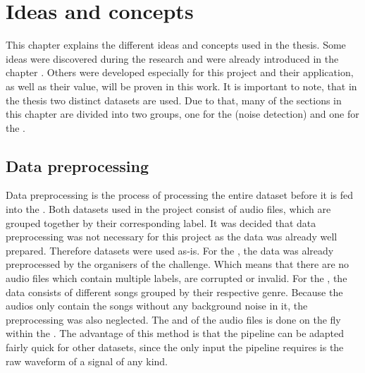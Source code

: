 \chapter{Ideas and concepts}
\label{ch:Ideas-Concepts}
This chapter explains the different ideas and concepts used in the thesis. Some ideas were discovered during the research and were already introduced in the chapter . Others were developed especially for this project and their application, as well as their value, will be proven in this work.
\newline
\newline
It is important to note, that in the thesis two distinct datasets are used. Due to that, many of the sections in this chapter are divided into two groups, one for the  (noise detection) and one for the .

\section{Data preprocessing}
\label{sec:Data-Preprocessing}
Data preprocessing is the process of processing the entire dataset before it is fed into the . Both datasets used in the project consist of audio files, which are grouped together by their corresponding label. It was decided that data preprocessing was not necessary for this project as the data was already well prepared. Therefore datasets were used as-is.
\newline
\newline
For the , the data was already preprocessed by the organisers of the challenge. Which means that there are no audio files which contain multiple labels, are corrupted or invalid.
\newline
\newline
For the , the data consists of different songs grouped by their respective genre. Because the audios only contain the songs without any background noise in it, the preprocessing was also neglected. 
\newline
\newline
The  and  of the audio files is done on the fly within the . The advantage of this method is that the pipeline can be adapted fairly quick for other datasets, since the only input the pipeline requires is the raw waveform of a signal of any kind. 

